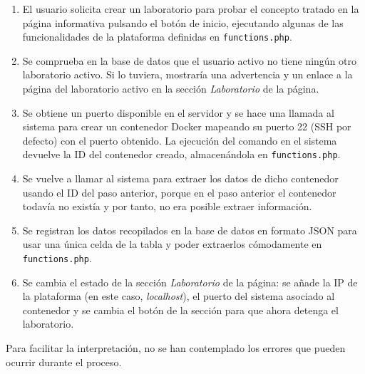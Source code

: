            \begin{enumerate}
                \item El usuario solicita crear un laboratorio para probar el concepto tratado en la página informativa pulsando el botón de inicio, ejecutando algunas de las funcionalidades de la plataforma definidas en \texttt{functions.php}.

                \item Se comprueba en la base de datos que el usuario activo no tiene ningún otro laboratorio activo. Si lo tuviera, mostraría una advertencia y un enlace a la página del laboratorio activo en la sección \textit{Laboratorio} de la página.

                \item Se obtiene un puerto disponible en el servidor y se hace una llamada al sistema para crear un contenedor Docker mapeando su puerto 22 (SSH por defecto) con el puerto obtenido. La ejecución del comando en el sistema devuelve la ID del contenedor creado, almacenándola en \texttt{functions.php}.

                \item Se vuelve a llamar al sistema para extraer los datos de dicho contenedor usando el ID del paso anterior, porque en el paso anterior el contenedor todavía no existía y por tanto, no era posible extraer información.
                
                \item Se registran los datos recopilados en la base de datos en formato JSON para usar una única celda de la tabla y poder extraerlos cómodamente en \texttt{functions.php}.

                \item Se cambia el estado de la sección \textit{Laboratorio} de la página: se añade la IP de la plataforma (en este caso, \textit{localhost}), el puerto del sistema asociado al contenedor y se cambia el botón de la sección para que ahora detenga el laboratorio.
            \end{enumerate}

            Para facilitar la interpretación, no se han contemplado los errores que pueden ocurrir durante el proceso.
            
            \newpage

